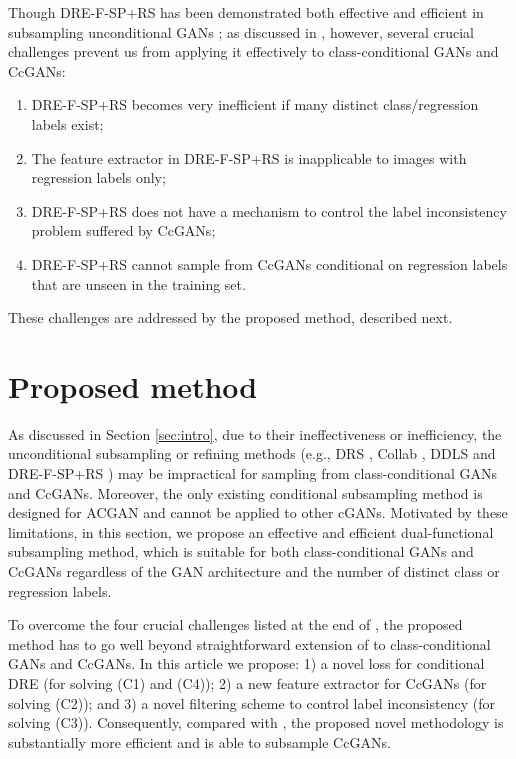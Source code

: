 \documentclass[final,12pt, 3p,times]{elsarticle}
\begin{document}
Though DRE-F-SP+RS has been demonstrated both effective and efficient in subsampling unconditional GANs \cite{ding2020subsampling}; as discussed in , however, several crucial challenges prevent us from applying it effectively to class-conditional GANs and CcGANs:
\begin{enumerate}[(C1)]
	\item DRE-F-SP+RS becomes very inefficient if many distinct class/regression labels exist;
	\item The feature extractor in DRE-F-SP+RS is inapplicable to images with regression labels only;
	\item DRE-F-SP+RS does not have a mechanism to control the label inconsistency problem suffered by CcGANs;
	\item DRE-F-SP+RS cannot sample from CcGANs conditional on regression labels that are unseen in the training set.
\end{enumerate}

These challenges are addressed by the proposed method, described next.

\section{Proposed method}\label{sec:method}
As discussed in Section \ref{sec:intro}, due to their ineffectiveness or inefficiency, the unconditional subsampling or refining methods (e.g., DRS \cite{azadi2018discriminator}, Collab \cite{liu2020collaborative}, DDLS \cite{che2020your} and DRE-F-SP+RS \cite{ding2020subsampling}) may be impractical for sampling from class-conditional GANs and CcGANs. Moreover, the only existing conditional subsampling method \cite{mo2019mining} is designed for ACGAN \cite{odena2017conditional} and cannot be applied to other cGANs. Motivated by these limitations, in this section, we propose an effective and efficient dual-functional subsampling method, which is suitable for both class-conditional GANs and CcGANs regardless of the GAN architecture and the number of distinct class or regression labels. 

To overcome the four crucial challenges listed at the end of , the proposed method has to go well beyond straightforward extension of \cite{ding2020subsampling} to class-conditional GANs and CcGANs.  In this article we propose: 1) a novel loss for conditional DRE (for solving (C1) and (C4)); 2) a new feature extractor for CcGANs (for solving (C2)); and 3) a novel filtering scheme to control label inconsistency (for solving (C3)). Consequently, compared with \cite{ding2020subsampling}, the proposed novel methodology is substantially more efficient and is able to subsample CcGANs.
\end{document}
